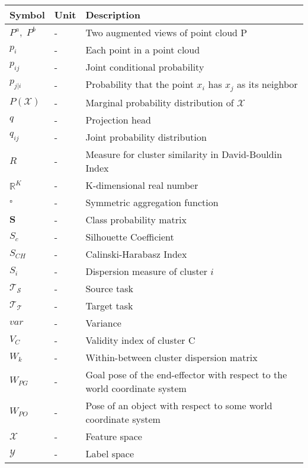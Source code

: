 \begin{table}[H]
  \setlength\extrarowheight{5pt}
  \centering
  \begin{tabular}{|p{70pt}|p{30pt}|p{270pt}|}
    \toprule
    Symbol	& Unit	& Description\\
    \midrule    
    $P^a, \; P^b$ & -& Two augmented views of point cloud P \\
    $p_i$ & - & Each point in a point cloud \\
    $\mathit{p_{ij}}$ & - & Joint conditional probability \\
    $p_{j|i}$ & - & Probability that the point $x_i$ has $x_j$ as its neighbor \\
    $\mathit{P(\mathcal{X})}$ & - & Marginal probability distribution of $\mathcal{X}$ \\
    $\mathit{q}$ & - & Projection head \\
    $\mathit{q_{ij}}$ & - & Joint probability distribution \\
    $\mathit{R}$ & - & Measure for cluster similarity in David-Bouldin Index \\
    $\mathbb{R}^\mathit{K}$ & - & K-dimensional real number \\
    $\square$ & - & Symmetric aggregation function \\
    $\mathbf{S}$ & - & Class probability matrix \\
    $\mathit{S_c}$ & - & Silhouette Coefficient \\
    $\mathit{S_{CH}}$ & - & Calinski-Harabasz Index \\
    $\mathit{S_i}$ & - & Dispersion measure of cluster $i$ \\
    $\mathit{\mathcal{T_S}}$ & - & Source task \\
    $\mathit{\mathcal{T_T}}$ & - & Target task \\
    $\mathit{var}$ & - & Variance \\
    $\mathit{V_C}$ & - & Validity index of cluster C \\
    $\mathit{W_k}$ & - & Within-between cluster dispersion matrix \\
    $W_{PG}$	& -	& Goal pose of the end-effector with respect to the world coordinate system \\
    $W_{PO}$	& -	& Pose of an object with respect to some world coordinate
    system \\
    $\mathcal{X}$ & - & Feature space \\
    $\mathit{\mathcal{Y}}$& - & Label space \\     
    \bottomrule
  \end{tabular}
\end{table}
